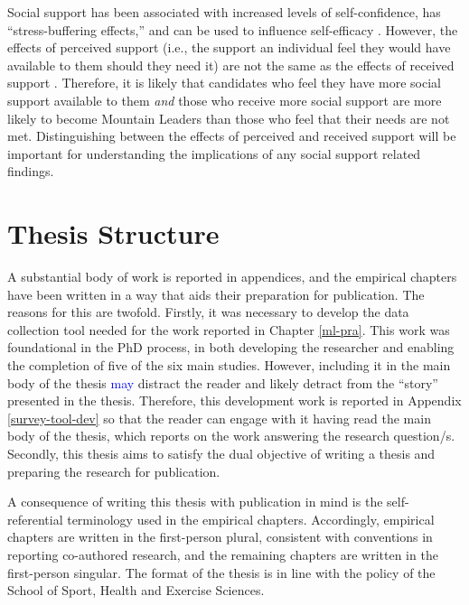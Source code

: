 \documentclass[
  12pt,
  a4paper,
]{book}
\begin{document}
Social support has been associated with increased levels of self-confidence, has ``stress-buffering effects,'' and can be used to influence self-efficacy \citep{Rees2007, Freeman2014, Samson2011}. However, the effects of perceived support (i.e., the support an individual feel they would have available to them should they need it) are not the same as the effects of received support \citep[the frequency with which support that has been provided to an individual; cf.~][]{Rees2007, Freeman2014}. Therefore, it is likely that candidates who feel they have more social support available to them \emph{and} those who receive more social support are more likely to become Mountain Leaders than those who feel that their needs are not met. Distinguishing between the effects of perceived and received support will be important for understanding the implications of any social support related findings.

\hypertarget{thesis-structure}{%
\section{Thesis Structure}\label{thesis-structure}}

A substantial body of work is reported in appendices, and the empirical chapters have been written in a way that aids their preparation for publication. The reasons for this are twofold. Firstly, it was necessary to develop the data collection tool needed for the work reported in Chapter \ref{ml-pra}. This work was foundational in the PhD process, in both developing the researcher and enabling the completion of five of the six main studies. However, including it in the main body of the thesis \textcolor{blue}{may} distract the reader and likely detract from the ``story'' presented in the thesis. Therefore, this development work is reported in Appendix \ref{survey-tool-dev} so that the reader can engage with it having read the main body of the thesis, which reports on the work answering the research question/s. Secondly, this thesis aims to satisfy the dual objective of writing a thesis and preparing the research for publication.

A consequence of writing this thesis with publication in mind is the self-referential terminology used in the empirical chapters. Accordingly, empirical chapters are written in the first-person plural, consistent with conventions in reporting co-authored research, and the remaining chapters are written in the first-person singular. The format of the thesis is in line with the policy of the School of Sport, Health and Exercise Sciences.
\end{document}
